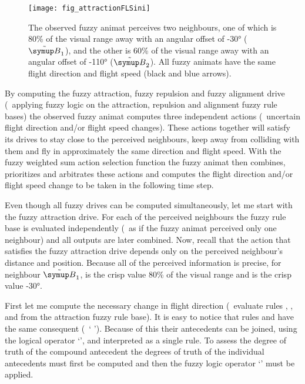 \begin{figure}
	\texttt{[image: fig\_attractionFLSini]}
	\caption{The observed fuzzy animat perceives two neighbours, one of which is 80\% of the visual range away with an angular offset of \ang{-30} ($\fautom{B}_1$), and the other is 60\% of the visual range away with an angular offset of \ang{-110} ($\fautom{B}_2$). All fuzzy animats have the same flight direction and flight speed (black and blue arrows).}
	\label{fig:attraction:FLS:ini}
\end{figure}

By computing the fuzzy attraction, fuzzy repulsion and fuzzy alignment drive (\ie\ applying fuzzy logic on the attraction, repulsion and alignment fuzzy rule bases) the observed fuzzy animat computes three independent actions (\ie\ uncertain flight direction and/or flight speed changes). These actions together will satisfy its drives to stay close to the perceived neighbours, keep away from colliding with them and fly in approximately the same direction and flight speed. With the fuzzy weighted sum action selection function the fuzzy animat then combines, prioritizes and arbitrates these actions and computes the flight direction and/or flight speed change to be taken in the following time step. 

Even though all fuzzy drives can be computed simultaneously, let me start with the fuzzy attraction drive. For each of the perceived neighbours the fuzzy rule base is evaluated independently (\ie\ as if the fuzzy animat perceived only one neighbour) and all outputs are later combined. Now, recall that the action that satisfies the fuzzy attraction drive depends only on the perceived neighbour's distance and position. Because all of the perceived information is precise, for neighbour $\fautom{B}_1$,  is the crisp value 80\% of the visual range and  is the crisp value \ang{-30}. 

First let me compute the necessary change in flight direction (\ie\ evaluate rules , ,  and  from the attraction fuzzy rule base). It is easy to notice that rules  and  have the same consequent (\ie\ `  '). Because of this their antecedents can be joined, using the logical operator `', and interpreted as a single rule. To assess the degree of truth of the compound antecedent the degrees of truth of the individual antecedents must first be computed and then the fuzzy logic operator `' must be applied. 

